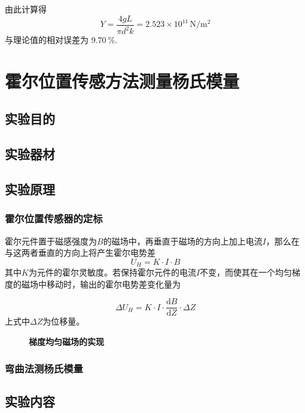 \documentclass[UTF8]{article}
\theoremstyle{MyLineTheoremStyle} %
\theoremstyle{MyBlockTheoremStyle} %
\theoremstyle{MySubsubsectionStyle} %
\begin{document}
由此计算得
	\begin{equation}
        Y=\frac{4gL}{\pi d^2k}=2.523\times10^{11}\,\mathrm{N/m^2}
    \end{equation}
与理论值的相对误差为 $9.70\ \%$.

\newpage
\section{霍尔位置传感方法测量杨氏模量}

\subsection{实验目的}
\subsection{实验器材}
\subsection{实验原理}
\subsubsection{霍尔位置传感器的定标}

霍尔元件置于磁感强度为$ B $的磁场中，再垂直于磁场的方向上加上电流$ I $，那么在与这两者垂直的方向上将产生霍尔电势差
\begin{equation}
    U_H=K\cdot I\cdot B
\end{equation}
其中$ K $为元件的霍尔灵敏度。若保持霍尔元件的电流$ I $不变，而使其在一个均匀梯度的磁场中移动时，输出的霍尔电势差变化量为

\begin{equation}
    \Delta U_H=K\cdot I\cdot\frac{\mathrm{d} B}{\mathrm{d} Z}\cdot\Delta Z
\end{equation}
上式中$ \Delta Z $为位移量。

\begin{figure}[H]
    \centering
    
    \caption{\textbf{梯度均匀磁场的实现}}\label{梯度均匀磁场的实现}
\end{figure}

\subsubsection{弯曲法测杨氏模量}

\subsection{实验内容}
\end{document}
